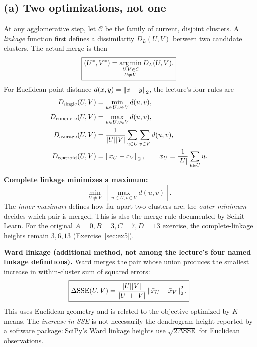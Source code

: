 \subsection*{(a) Two optimizations, not one}
At any agglomerative step, let $\mathcal C$ be the family of current, disjoint clusters. A \emph{linkage} function first defines a dissimilarity $D_L(U,V)$ between two candidate clusters. The actual merge is then
\[
\boxed{(U^*,V^*)=\operatorname*{arg\,min}_{\substack{U,V\in\mathcal C\\U\ne V}}D_L(U,V).}
\]
For Euclidean point distance $d(x,y)=\left\lVert x-y\right\rVert_2$, the lecture's four rules are
\begin{align*}
D_{\rm single}(U,V)&=\min_{u\in U,v\in V}d(u,v),\\
D_{\rm complete}(U,V)&=\max_{u\in U,v\in V}d(u,v),\\
D_{\rm average}(U,V)&=\frac{1}{|U||V|}\sum_{u\in U}\sum_{v\in V}d(u,v),\\
D_{\rm centroid}(U,V)&=\left\lVert\bar x_U-\bar x_V\right\rVert_2,\qquad
\bar x_U=\frac{1}{|U|}\sum_{u\in U}u.
\end{align*}
\begin{important}
\textbf{Complete linkage minimizes a maximum:}
\[
\boxed{\min_{U\ne V}\ \left[\max_{u\in U,v\in V}d(u,v)\right].}
\]
The \emph{inner maximum} defines how far apart two clusters are; the \emph{outer minimum} decides which pair is merged. This is also the merge rule documented by Scikit-Learn. For the original $A=0,B=3,C=7,D=13$ exercise, the complete-linkage heights remain $3,6,13$ (Exercise~\ref{sec:ex5}).
\end{important}

\textbf{Ward linkage (additional method, not among the lecture's four named linkage definitions).} Ward merges the pair whose union produces the smallest increase in within-cluster sum of squared errors:
\[
\boxed{\Delta\mathrm{SSE}(U,V)=\frac{|U||V|}{|U|+|V|}\left\lVert\bar x_U-\bar x_V\right\rVert_2^2.}
\]
This uses Euclidean geometry and is related to the objective optimized by $K$-means. The \emph{increase in SSE} is not necessarily the dendrogram height reported by a software package: SciPy's Ward linkage heights use $\sqrt{2\Delta\mathrm{SSE}}$ for Euclidean observations.

